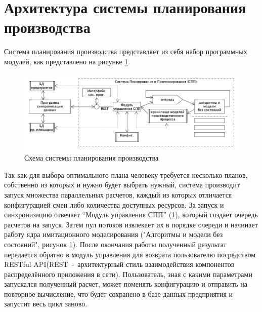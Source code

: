 \section{Архитектура системы планирования производства}
\indent Система планирования производства представляет из себя набор программных модулей, как представлено на рисунке \ref{fig:archSPP}.

\begin{figure}[ht]
	\centering
	\includegraphics[width=\linewidth]{pics/archSPP.png}
	\caption{Схема системы планирования производства \cite{niorkpz}}
	\label{fig:archSPP}
\end{figure}

\indent Так как для выбора оптимального плана человеку требуется несколько планов, собственно из которых и нужно будет выбрать нужный, система производит запуск множества параллельных расчетов, каждый из которых отличается конфигурацией смен либо количества доступных ресурсов.
За запуск и синхронизацию отвечает ``Модуль управления СПП'' (\ref{fig:archSPP}), который создает очередь расчетов на запуск.
Затем пул потоков извлекает их в порядке очереди и начинает работу ядра имитационного моделирования ("Алгоритмы и модели без состояний", рисунок \ref{fig:archSPP}).
После окончания работы полученный результат передается обратно в модуль управления для возврата пользователю посредством RESTful API(REST~-~архитектурный стиль взаимодействия компонентов распределённого приложения в сети).
Пользователь, зная с какими параметрами запускался полученный расчет, может поменять конфигурацию и отправить на повторное вычисление, что будет сохранено в базе данных предприятия и запустит весь цикл заново.